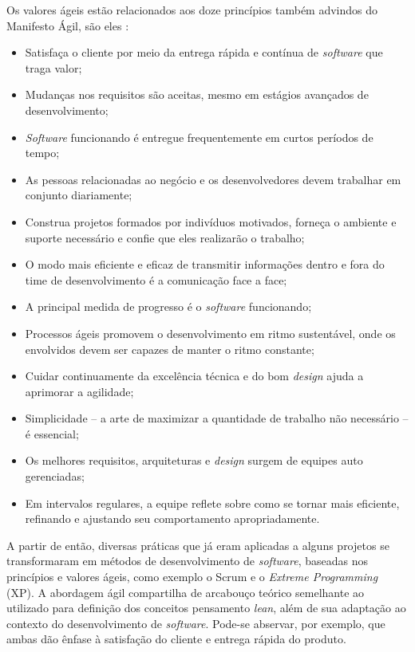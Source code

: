 Os valores ágeis estão relacionados aos doze princípios também advindos do Manifesto Ágil, são eles \cite{manifesto}:
\begin{itemize}
\item Satisfaça o cliente por meio da entrega rápida e contínua de  \textit{software} que traga valor;
\item Mudanças nos requisitos são aceitas, mesmo em estágios avançados de desenvolvimento;
\item  \textit{Software} funcionando é entregue frequentemente em curtos períodos de tempo;
\item As pessoas relacionadas ao negócio e os desenvolvedores devem trabalhar em conjunto diariamente;
\item Construa projetos formados por indivíduos motivados, forneça o ambiente e suporte necessário e confie que eles realizarão o trabalho;
\item O modo mais eficiente e eficaz de transmitir informações dentro e fora do time de desenvolvimento é a comunicação face a face;
\item A principal medida de progresso é o  \textit{software} funcionando;
\item Processos ágeis promovem o desenvolvimento em ritmo sustentável, onde os envolvidos devem ser capazes de manter o ritmo constante;
\item Cuidar continuamente da excelência técnica e do bom \textit{design} ajuda a aprimorar a agilidade;
\item Simplicidade – a arte de maximizar a quantidade de trabalho não necessário – é essencial;
\item Os melhores requisitos, arquiteturas e \textit{design} surgem de equipes auto gerenciadas;
\item Em intervalos regulares, a equipe reflete sobre como se tornar mais eficiente, refinando e ajustando seu comportamento apropriadamente.
\end{itemize}

A partir de então, diversas práticas que já eram aplicadas a alguns projetos se transformaram em métodos de desenvolvimento de  \textit{software}, baseadas nos princípios e valores ágeis, como exemplo o Scrum e o \textit{Extreme Programming} (XP). A abordagem ágil compartilha de arcabouço teórico semelhante ao utilizado para definição dos conceitos pensamento \textit{lean}, além de sua adaptação ao contexto do desenvolvimento de  \textit{software}. Pode-se abservar, por exemplo, que ambas dão ênfase à satisfação do cliente e entrega rápida do produto.

